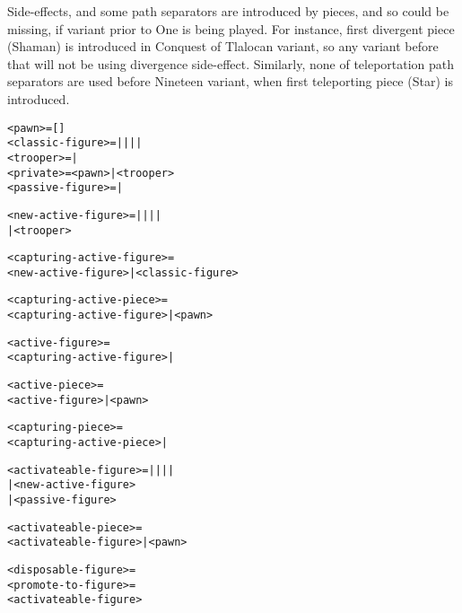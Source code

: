 Side-effects, and some path separators are introduced by pieces, and so could
be missing, if variant prior to One is being played. For instance, first
divergent piece (Shaman) is introduced in Conquest of Tlalocan variant, so any
variant before that will not be using divergence side-effect. Similarly, none
of teleportation path separators are used before Nineteen variant, when first
teleporting piece (Star) is introduced.

\clearpage %

\begin{alltt}
<pawn> = []
<classic-figure> =  |  |  |  | 
<trooper> =  | 
<private> = <pawn> | <trooper>
<passive-figure> =  | 

<new-active-figure> =  |  |  |  | 
                    | <trooper>

<capturing-active-figure> =
  <new-active-figure> | <classic-figure>

<capturing-active-piece> =
  <capturing-active-figure> | <pawn>

<active-figure> =
  <capturing-active-figure> | 

<active-piece> =
  <active-figure> | <pawn>

<capturing-piece> =
  <capturing-active-piece> | 

<activateable-figure> =  |  |  |  | 
                      | <new-active-figure>
                      | <passive-figure>

<activateable-piece> =
  <activateable-figure> | <pawn>

<disposable-figure> =
<promote-to-figure> =
  <activateable-figure>
\end{alltt}

\clearpage %

